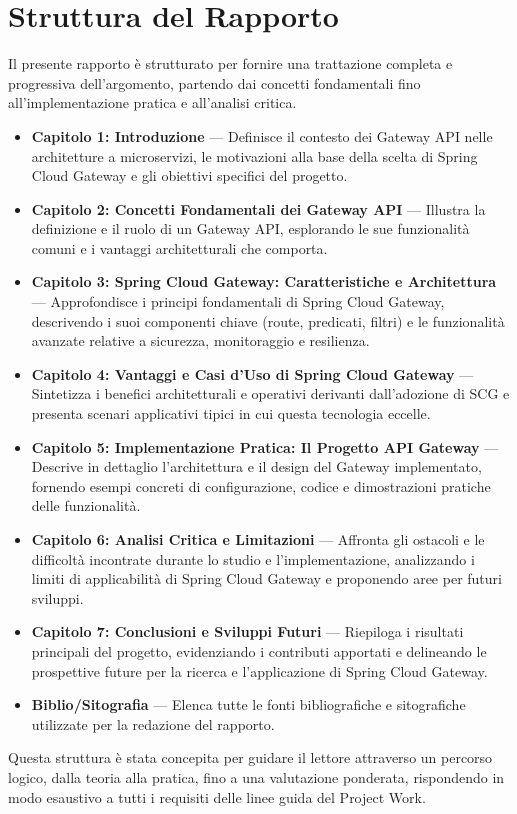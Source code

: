 \section{Struttura del Rapporto}

Il presente rapporto è strutturato per fornire una trattazione completa e progressiva dell'argomento, partendo dai concetti fondamentali fino all'implementazione pratica e all'analisi critica.
\begin{itemize}
    \item \textbf{Capitolo 1: Introduzione} --- Definisce il contesto dei Gateway API nelle architetture a microservizi, le motivazioni alla base della scelta di Spring Cloud Gateway e gli obiettivi specifici del progetto.
    \item \textbf{Capitolo 2: Concetti Fondamentali dei Gateway API} --- Illustra la definizione e il ruolo di un Gateway API, esplorando le sue funzionalità comuni e i vantaggi architetturali che comporta.
    \item \textbf{Capitolo 3: Spring Cloud Gateway: Caratteristiche e Architettura} --- Approfondisce i principi fondamentali di Spring Cloud Gateway, descrivendo i suoi componenti chiave (route, predicati, filtri) e le funzionalità avanzate relative a sicurezza, monitoraggio e resilienza.
    \item \textbf{Capitolo 4: Vantaggi e Casi d'Uso di Spring Cloud Gateway} --- Sintetizza i benefici architetturali e operativi derivanti dall'adozione di SCG e presenta scenari applicativi tipici in cui questa tecnologia eccelle.
    \item \textbf{Capitolo 5: Implementazione Pratica: Il Progetto API Gateway} --- Descrive in dettaglio l'architettura e il design del Gateway implementato, fornendo esempi concreti di configurazione, codice e dimostrazioni pratiche delle funzionalità.
    \item \textbf{Capitolo 6: Analisi Critica e Limitazioni} --- Affronta gli ostacoli e le difficoltà incontrate durante lo studio e l'implementazione, analizzando i limiti di applicabilità di Spring Cloud Gateway e proponendo aree per futuri sviluppi.
    \item \textbf{Capitolo 7: Conclusioni e Sviluppi Futuri} --- Riepiloga i risultati principali del progetto, evidenziando i contributi apportati e delineando le prospettive future per la ricerca e l'applicazione di Spring Cloud Gateway.
    \item \textbf{Biblio/Sitografia} --- Elenca tutte le fonti bibliografiche e sitografiche utilizzate per la redazione del rapporto.
\end{itemize}
Questa struttura è stata concepita per guidare il lettore attraverso un percorso logico, dalla teoria alla pratica, fino a una valutazione ponderata, rispondendo in modo esaustivo a tutti i requisiti delle linee guida del Project Work.